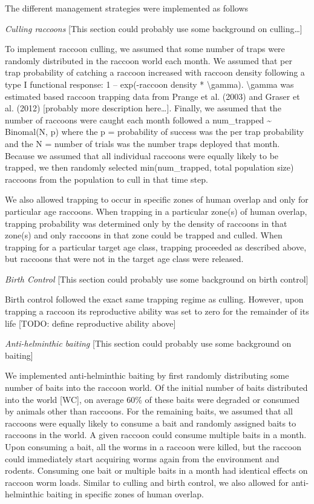 \documentclass[11pt]{article}
\begin{document}
The different management strategies were implemented as follows

\emph{Culling raccoons} {[}This section could probably use some
background on culling\ldots{}{]}

To implement raccoon culling, we assumed that some number of traps were
randomly distributed in the raccoon world each month. We assumed that
per trap probability of catching a raccoon increased with raccoon
density following a type I functional response: 1 -- exp(-raccoon
density * \textbackslash{}gamma). \textbackslash{}gamma was estimated
based raccoon trapping data from Prange et al. (2003) and Graser et al.
(2012) {[}probably more description here\ldots{}{]}. Finally, we assumed
that the number of raccoons were caught each month followed a
num\_trapped \textasciitilde{} Binomal(N, p) where the p = probability
of success was the per trap probability and the N = number of trials was
the number traps deployed that month. Because we assumed that all
individual raccoons were equally likely to be trapped, we then randomly
selected min(num\_trapped, total population size) raccoons from the
population to cull in that time step.

We also allowed trapping to occur in specific zones of human overlap and
only for particular age raccoons. When trapping in a particular zone(s)
of human overlap, trapping probability was determined only by the
density of raccoons in that zone(s) and only raccoons in that zone could
be trapped and culled. When trapping for a particular target age class,
trapping proceeded as described above, but raccoons that were not in the
target age class were released.

\emph{Birth Control} {[}This section could probably use some background
on birth control{]}

Birth control followed the exact same trapping regime as culling.
However, upon trapping a raccoon its reproductive ability was set to
zero for the remainder of its life {[}TODO: define reproductive ability
above{]}

\emph{Anti-helminthic baiting} {[}This section could probably use some
background on baiting{]}

We implemented anti-helminthic baiting by first randomly distributing
some number of baits into the raccoon world. Of the initial number of
baits distributed into the world {[}WC{]}, on average 60\% of these
baits were degraded or consumed by animals other than raccoons. For the
remaining baits, we assumed that all raccoons were equally likely to
consume a bait and randomly assigned baits to raccoons in the world. A
given raccoon could consume multiple baits in a month. Upon consuming a
bait, all the worms in a raccoon were killed, but the raccoon could
immediately start acquiring worms again from the environment and
rodents. Consuming one bait or multiple baits in a month had identical
effects on raccoon worm loads. Similar to culling and birth control, we
also allowed for anti-helminthic baiting in specific zones of human
overlap.
\end{document}
